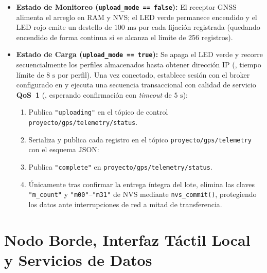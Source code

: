 \documentclass[12pt, letterpaper]{article}
\begin{document}
\begin{itemize}
    \item \textbf{Estado de Monitoreo (\texttt{upload\_mode == false}):} El receptor GNSS alimenta el arreglo en RAM y NVS; el LED verde permanece encendido y el LED rojo emite un destello de $100\text{ ms}$ por cada fijación registrada (quedando encendido de forma continua si se alcanza el límite de 256 registros).
    \item \textbf{Estado de Carga (\texttt{upload\_mode == true}):} Se apaga el LED verde y  recorre secuencialmente los perfiles almacenados hasta obtener dirección IP (, tiempo límite de $8\text{ s}$ por perfil). Una vez conectado,  establece sesión con el broker configurado en  y ejecuta una secuencia transaccional con calidad de servicio \textbf{QoS~1} (, esperando confirmación  con \textit{timeout} de $5\text{ s}$):
    \begin{enumerate}
        \item Publica \texttt{"uploading"} en el tópico de control \texttt{proyecto/gps/telemetry/status}.
        \item Serializa y publica cada registro en el tópico \texttt{proyecto/gps/telemetry} con el esquema JSON:
        \begin{center}
            \small{}
        \end{center}
        \item Publica \texttt{"complete"} en \texttt{proyecto/gps/telemetry/status}.
        \item Únicamente tras confirmar la entrega íntegra del lote, elimina las claves \texttt{"m\_count"} y \texttt{"m00"}--\texttt{"m31"} de NVS mediante \texttt{nvs\_commit()}, protegiendo los datos ante interrupciones de red a mitad de transferencia.
    \end{enumerate}
\end{itemize}

\vspace*{0.8cm}
\section*{\centering \fontsize{16}{17}\sffamily\selectfont Nodo Borde, Interfaz Táctil Local y Servicios de Datos}
\end{document}
